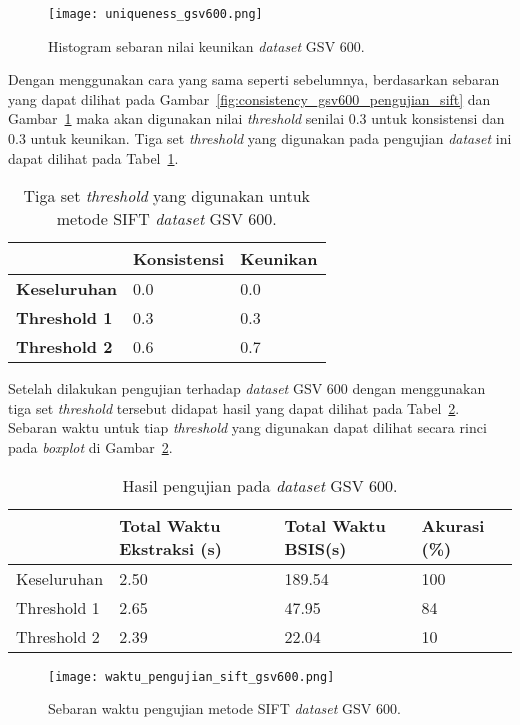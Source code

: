 \begin{figure}[H]
	\centering
	\texttt{[image: uniqueness\_gsv600.png]}
	\caption{Histogram sebaran nilai keunikan \textit{dataset} GSV 600.}
	\label{fig:uniqueness_gsv600_pengujian_sift}
\end{figure}
Dengan menggunakan cara yang sama seperti sebelumnya, berdasarkan sebaran yang dapat dilihat pada Gambar~\ref{fig:consistency_gsv600_pengujian_sift} dan Gambar~\ref{fig:uniqueness_gsv600_pengujian_sift} maka akan digunakan nilai \textit{threshold} senilai 0.3 untuk konsistensi dan 0.3 untuk keunikan. Tiga set \textit{threshold} yang digunakan pada pengujian \textit{dataset} ini dapat dilihat pada Tabel~\ref{tab:threshold_gsv600_sift}.
\begin{table}[H]
	\centering
	\begin{tabular}{|l|l|l|}
		\hline
		& \textbf{Konsistensi} & \textbf{Keunikan} \\ \hline
		\textbf{Keseluruhan} & 0.0                  & 0.0               \\ \hline
		\textbf{Threshold 1} & 0.3                  & 0.3               \\ \hline
		\textbf{Threshold 2} & 0.6                  & 0.7               \\ \hline
	\end{tabular}
	\caption{Tiga set \textit{threshold} yang digunakan untuk metode SIFT \textit{dataset} GSV 600.}
	\label{tab:threshold_gsv600_sift}
\end{table}
Setelah dilakukan pengujian terhadap \textit{dataset} GSV 600 dengan menggunakan tiga set \textit{threshold} tersebut didapat hasil yang dapat dilihat pada Tabel~\ref{tab:pengujian_sift_gsv600}. Sebaran waktu untuk tiap \textit{threshold} yang digunakan dapat dilihat secara rinci pada \textit{boxplot} di Gambar~\ref{fig:waktu_pengujian_sift_gsv600}.

\begin{table}[H]
	\centering
	\begin{tabular}{|l|l|l|l|}
		\hline
		& \textbf{Total Waktu Ekstraksi (s)} & \textbf{Total Waktu BSIS(s)} & \textbf{Akurasi (\%)} \\ \hline
		Keseluruhan & 2.50 & 189.54                   & 100                    \\ \hline
		Threshold 1 & 2.65 & 47.95                    & 84                    \\ \hline
		Threshold 2 & 2.39 & 22.04                    & 10                    \\ \hline
	\end{tabular}
	\caption{Hasil pengujian pada \textit{dataset} GSV 600.}
	\label{tab:pengujian_sift_gsv600}
\end{table}
\begin{figure}[H]
	\centering
	\texttt{[image: waktu\_pengujian\_sift\_gsv600.png]}
	\caption{Sebaran waktu pengujian metode SIFT \textit{dataset} GSV 600.}
	\label{fig:waktu_pengujian_sift_gsv600}
\end{figure}

